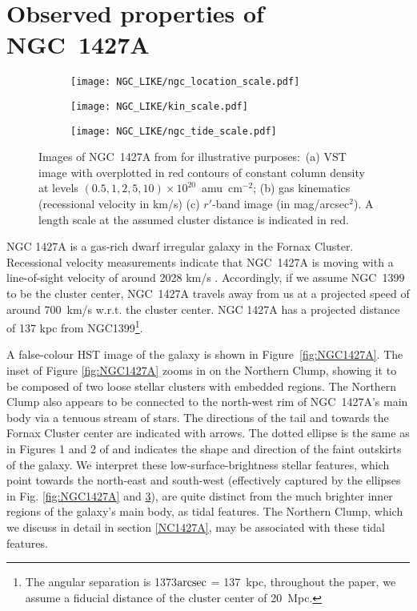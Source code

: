 \section{Observed properties of NGC~1427A} \label{sec:observations}
\begin{figure*}
\centering
\begin{subfigure}[b]{0.49\textwidth}
  \centering
  \texttt{[image: NGC\_LIKE/ngc\_location\_scale.pdf]}\\[3ex]
  \caption{}
  \label{fig:hi_contours}
\end{subfigure}
\begin{subfigure}[b]{0.49\textwidth}
  \centering
  \texttt{[image: NGC\_LIKE/kin\_scale.pdf]}\\[3ex]
  \caption{}
  \label{fig:hi_kin}
\end{subfigure}
\begin{subfigure}[b]{0.6\textwidth}
  \centering
  \texttt{[image: NGC\_LIKE/ngc\_tide\_scale.pdf]}%
  \caption{}
  \label{fig:r_band}
\end{subfigure}
\caption{
Images of NGC~1427A from \citet{Lee-Waddell2018} for illustrative purposes:~(a) VST image with overplotted in red contours of constant \Hi{} column density at levels $(0.5, 1, 2, 5, 10) \times 10^{20}$~amu~cm$^{-2}$;
(b) gas kinematics (recessional velocity in km/s)
(c) $r'$-band image (in mag/arcsec$^2$).
A length scale at the assumed cluster distance is indicated in red.}
\label{fig:NGC_OBSERVATIONS}
\end{figure*}
NGC 1427A is a gas-rich dwarf irregular galaxy in the Fornax Cluster.
Recessional velocity measurements indicate that NGC~1427A is moving with a line-of-sight velocity of around 2028 km/s \citep{Bureau1996, Schroder2001}.
Accordingly, if we assume NGC~1399 to be the cluster center, NGC~1427A travels away from us at a projected speed of around 700~km/s w.r.t. the cluster center. NGC 1427A has a projected distance of 137 kpc from NGC1399\footnote{The angular separation is 1373$\arcsec$ = 137~kpc, throughout the paper, we assume a fiducial distance of the cluster center of 20~Mpc.}.

A false-colour HST image of the galaxy is shown in Figure~\ref{fig:NGC1427A}.
The inset of Figure \ref{fig:NGC1427A} zooms in on the Northern Clump, showing it to be composed of two loose stellar clusters with embedded \Hii{} regions. The Northern Clump also appears to be connected to the north-west rim of NGC~1427A's main body via a tenuous stream of stars. The directions of the \Hi{} tail and towards the Fornax Cluster center are indicated with arrows. The dotted ellipse is the same as in Figures 1 and 2 of \citet{Lee-Waddell2018} and indicates the shape and direction of the faint outskirts of the galaxy. We interpret these low-surface-brightness stellar features, which point towards the north-east and south-west (effectively captured by the ellipses in Fig. \ref{fig:NGC1427A} and \ref{fig:r_band}), are quite distinct from the much brighter inner regions of the galaxy's main body, as tidal features. The Northern Clump, which we discuss in detail in section \ref{NC1427A}, may be associated with these tidal features.

